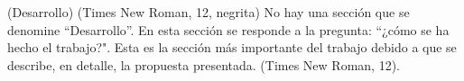 (Desarrollo)	 (Times New Roman, 12, negrita) No hay una sección que se denomine “Desarrollo”. En esta sección  se responde a la pregunta: “¿cómo se ha hecho el trabajo?". Esta es la sección más importante del trabajo debido a que se describe, en detalle, la propuesta presentada. (Times New Roman, 12).
